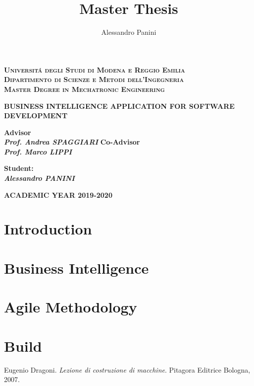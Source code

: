 \documentclass[a4paper,12pt,twoside]{report}
\title{\textbf{Master Thesis}}
\date{}
\author{Alessandro Panini}
\newlength{\drop}%
\newcommand*{\titleSal}%
{
	\begin{center}  
		\begingroup
		{\Large\bfseries\rmfamily\scshape Universit\'a degli Studi di Modena e Reggio Emilia}\\
		{\Large\bfseries\rmfamily\scshape Dipartimento di Scienze e Metodi dell'Ingegneria }\\[\baselineskip]
		\vspace*{1cm}
		\vspace*{\drop}
		{\Large\bfseries\rmfamily\scshape Master Degree in Mechatronic Engineering}\\[\baselineskip]
		\vspace*{\drop}
		
		\vspace*{3cm}
		
		\linespread{3}
		{\LARGE\bfseries\rmfamily BUSINESS INTELLIGENCE APPLICATION FOR SOFTWARE DEVELOPMENT}\\
		\vspace*{4cm}
		
	\end{center}
	\vspace*{2cm}   
	\begin{minipage}{0.5\textwidth}
		\begin{flushleft}
			{\small\bfseries Advisor}\\
			{\bfseries\itshape Prof. Andrea SPAGGIARI }
			{\small\bfseries Co-Advisor}\\
			{\bfseries\itshape Prof. Marco LIPPI }
		\end{flushleft}
	\end{minipage}
	\begin{minipage}{0.4\textwidth}
		\begin{flushright} 
		    \vspace{\baselineskip}
		    \vspace{\baselineskip}
			{\bfseries\small Student:}\\
			{\bfseries\itshape Alessandro PANINI}
		\end{flushright}
	\end{minipage}  
	\vfill
	
	{\large\bfseries\rmfamily ACADEMIC YEAR 2019-2020}
	
	\endgroup
}
\begin{document}
	
\titleSal
\pagestyle{plain}

\newcommand*\rot{\multicolumn{1}{R{45}{1em}}}

	
	\newpage
	
	
	\tableofcontents
	\cleardoublepage
\chapter*{}

	
\chapter*{Introduction}


\chapter{Business Intelligence}
	

\chapter{Agile Methodology}
	

\chapter{Build}
	
		
\cleardoublepage

\begin{thebibliography}{9}
	
	Eugenio Dragoni. 
	\textit{Lezione di costruzione di macchine}.
	Pitagora Editrice Bologna, 2007.
	
\end{thebibliography}
\end{document}
